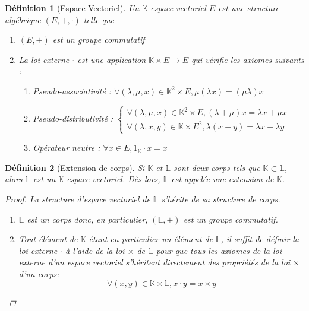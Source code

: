 \documentclass[a4paper,12pt,french]{report}
\newtheorem{definition}{Définition}[section]
\begin{document}
			
			\begin{definition}[Espace Vectoriel]
				Un \(\mathbb{K}\)-espace vectoriel \(E\)  est une structure algébrique \( (E, + , \cdot)\) telle que
				\begin{enumerate}
					\item \( (E, +) \) est un groupe commutatif
					\item La loi externe \( \cdot \) est une application \( \mathbb{K} \times E \longrightarrow E \) qui vérifie les axiomes suivants :
						\begin{enumerate}
							\item Pseudo-associativité :
								\(
								\forall (\lambda, \mu, x) \in \mathbb{K}^2 \times E, \mu(\lambda x) = (\mu \lambda) x
								\)
							\item Pseudo-distributivité :
								\(
								\left\{
									\begin{array}{ll}
										\forall (\lambda, \mu, x) \in \mathbb{K}^2 \times E , (\lambda + \mu)x = \lambda x + \mu x \\
										\forall (\lambda, x, y) \in \mathbb{K} \times E^2 , \lambda(x + y) = \lambda x + \lambda y
									\end{array}
								\right.
								\)
							\item Opérateur neutre :
								\(
								\forall x \in E, 1_\mathbb{K} \cdot x = x
								\)
						\end{enumerate}
				\end{enumerate}
				
			\end{definition}
			
			
			\begin{definition}[Extension de corps]
			
				Si \( \mathbb{K} \) et \( \mathbb{L} \) sont deux corps tels que \(\mathbb{K} \subset  \mathbb{L} \), alors
				\(\mathbb{L}\) est un \(\mathbb{K}\)-espace vectoriel. Dès lors, \(\mathbb{L}\) est appelée une \emph{extension} de \(\mathbb{K}\).
			
				\begin{proof}
					La structure d'espace vectoriel de \(\mathbb{L}\) s'hérite de sa structure de corps.
					\begin{enumerate}
						\item \(\mathbb{L}\) est un corps donc, en particulier, \((\mathbb{L}, +)\) est un groupe commutatif.
						\item Tout élément de \(\mathbb{K}\) étant en particulier un élément de \(\mathbb{L}\), il suffit de définir la loi
						externe \(\cdot\) à l'aide de la loi \( \times \) de \(\mathbb{L}\) pour que tous les axiomes de la loi externe d'un espace vectoriel s'héritent directement des propriétés de la loi \( \times \) d'un corps:
							\[
							\forall (x, y) \in \mathbb{K} \times \mathbb{L}, x \cdot y = x \times y
							\]
					\end{enumerate}
				\end{proof}
			\end{definition}
			
\end{document}
